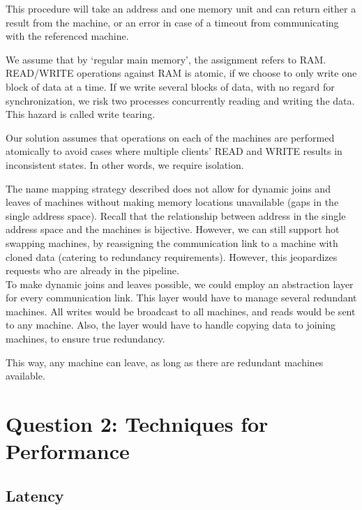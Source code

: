\documentclass[11pt]{article}
\begin{document}
This procedure will take an address and one memory unit and can return either a
result from the machine, or an error in case of a timeout from communicating
with the referenced machine.


We assume that by ‘regular main memory’, the assignment refers to RAM. READ/WRITE operations against RAM is atomic, if we choose to only write one block of data at a time. If we write several blocks of data, with no regard for synchronization, we risk two processes concurrently reading and writing the data. This hazard is called write tearing. 

Our solution assumes that operations on each of the machines are performed
atomically to avoid cases where multiple clients' READ and WRITE results in
inconsistent states. In other words, we require isolation.



The name mapping strategy described does not allow for dynamic joins and leaves
of machines without making memory locations unavailable (gaps in the single address
space). Recall that the relationship between address in the single address space
and the machines is bijective.
However, we can still support hot
swapping machines, by reassigning the communication link to a machine with cloned
data (catering to redundancy requirements). However, this jeopardizes requests who
are already in the pipeline.\\

To make dynamic joins and leaves possible, we could employ an abstraction layer for every communication link. This layer would have to manage several redundant machines. All writes would be broadcast to all machines, and reads would be sent to any machine. Also, the layer would have to handle copying data to joining machines, to ensure true redundancy. 

This way, any machine can leave, as long as there are redundant machines available.

\section*{Question 2: Techniques for Performance}

\subsection*{Latency}
\end{document}
